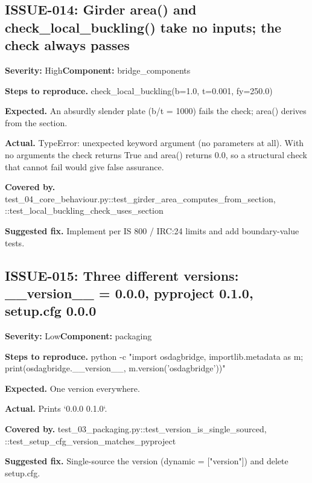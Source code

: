 \subsection*{ISSUE-014: Girder area() and check\_\allowbreak{}local\_\allowbreak{}buckling() take no inputs; the check always passes}
\textbf{Severity:} High\quad \textbf{Component:} bridge\_\allowbreak{}components\par
\textbf{Steps to reproduce.} check\_\allowbreak{}local\_\allowbreak{}buckling(b=1.\allowbreak{}0, t=0.\allowbreak{}001, fy=250.\allowbreak{}0)\par
\textbf{Expected.} An absurdly slender plate (b/\allowbreak{}t = 1000) fails the check; area() derives from the section.\allowbreak{}\par
\textbf{Actual.} TypeError: unexpected keyword argument (no parameters at all).\allowbreak{} With no arguments the check returns True and area() returns 0.\allowbreak{}0, so a structural check that cannot fail would give false assurance.\allowbreak{}\par
\textbf{Covered by.} test\_\allowbreak{}04\_\allowbreak{}core\_\allowbreak{}behaviour.\allowbreak{}py::\allowbreak{}test\_\allowbreak{}girder\_\allowbreak{}area\_\allowbreak{}computes\_\allowbreak{}from\_\allowbreak{}section, ::\allowbreak{}test\_\allowbreak{}local\_\allowbreak{}buckling\_\allowbreak{}check\_\allowbreak{}uses\_\allowbreak{}section\par
\textbf{Suggested fix.} Implement per IS 800 /\allowbreak{} IRC:24 limits and add boundary-value tests.\allowbreak{}

\subsection*{ISSUE-015: Three different versions: \_\allowbreak{}\_\allowbreak{}version\_\allowbreak{}\_\allowbreak{} = 0.\allowbreak{}0.\allowbreak{}0, pyproject 0.\allowbreak{}1.\allowbreak{}0, setup.\allowbreak{}cfg 0.\allowbreak{}0.\allowbreak{}0}
\textbf{Severity:} Low\quad \textbf{Component:} packaging\par
\textbf{Steps to reproduce.} python -c "import osdagbridge, importlib.\allowbreak{}metadata as m; print(osdagbridge.\allowbreak{}\_\allowbreak{}\_\allowbreak{}version\_\allowbreak{}\_\allowbreak{}, m.\allowbreak{}version('osdagbridge'))"\par
\textbf{Expected.} One version everywhere.\allowbreak{}\par
\textbf{Actual.} Prints `0.\allowbreak{}0.\allowbreak{}0 0.\allowbreak{}1.\allowbreak{}0`.\allowbreak{}\par
\textbf{Covered by.} test\_\allowbreak{}03\_\allowbreak{}packaging.\allowbreak{}py::\allowbreak{}test\_\allowbreak{}version\_\allowbreak{}is\_\allowbreak{}single\_\allowbreak{}sourced, ::\allowbreak{}test\_\allowbreak{}setup\_\allowbreak{}cfg\_\allowbreak{}version\_\allowbreak{}matches\_\allowbreak{}pyproject\par
\textbf{Suggested fix.} Single-source the version (dynamic = ["version"]) and delete setup.\allowbreak{}cfg.\allowbreak{}

